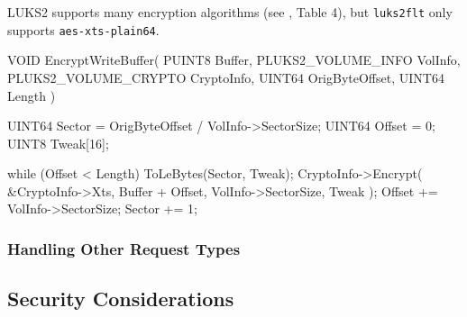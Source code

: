 
LUKS2 supports many encryption algorithms (see \cite{Broz2018}, Table 4), but \texttt{luks2flt} only supports \texttt{aes-xts-plain64}.

\begin{ccode}
VOID
EncryptWriteBuffer(
    PUINT8 Buffer,
    PLUKS2_VOLUME_INFO VolInfo,
    PLUKS2_VOLUME_CRYPTO CryptoInfo,
    UINT64 OrigByteOffset,
    UINT64 Length
)
{
    UINT64 Sector = OrigByteOffset / VolInfo->SectorSize;
    UINT64 Offset = 0;
    UINT8 Tweak[16];

    while (Offset < Length) {
        ToLeBytes(Sector, Tweak);
        CryptoInfo->Encrypt(
            &CryptoInfo->Xts, Buffer + Offset,
            VolInfo->SectorSize, Tweak
        );
        Offset += VolInfo->SectorSize;
        Sector += 1;
    }
}
\end{ccode}

\subsubsection{Handling Other Request Types}
\label{chap:ourapproach.final.otherrequests}

\subsection{Security Considerations}
\label{chap:ourapproach.security}
